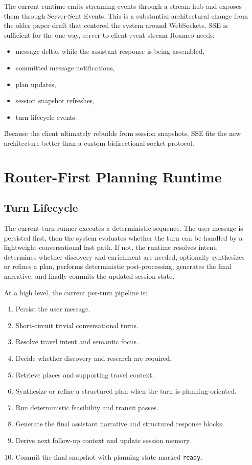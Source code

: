 \documentclass[conference]{IEEEtran}
\begin{document}
The current runtime emits streaming events through a stream hub and exposes them through Server-Sent Events. This is a substantial architectural change from the older paper draft that centered the system around WebSockets. SSE is sufficient for the one-way, server-to-client event stream Roameo needs:

\begin{itemize}
  \item message deltas while the assistant response is being assembled,
  \item committed message notifications,
  \item plan updates,
  \item session snapshot refreshes,
  \item turn lifecycle events.
\end{itemize}

Because the client ultimately rebuilds from session snapshots, SSE fits the new architecture better than a custom bidirectional socket protocol.

\section{Router-First Planning Runtime}

\subsection{Turn Lifecycle}

The current turn runner executes a deterministic sequence. The user message is persisted first, then the system evaluates whether the turn can be handled by a lightweight conversational fast path. If not, the runtime resolves intent, determines whether discovery and enrichment are needed, optionally synthesizes or refines a plan, performs deterministic post-processing, generates the final narrative, and finally commits the updated session state.

At a high level, the current per-turn pipeline is:

\begin{enumerate}
  \item Persist the user message.
  \item Short-circuit trivial conversational turns.
  \item Resolve travel intent and semantic focus.
  \item Decide whether discovery and research are required.
  \item Retrieve places and supporting travel context.
  \item Synthesize or refine a structured plan when the turn is planning-oriented.
  \item Run deterministic feasibility and transit passes.
  \item Generate the final assistant narrative and structured response blocks.
  \item Derive next follow-up context and update session memory.
  \item Commit the final snapshot with planning state marked \texttt{ready}.
\end{enumerate}
\end{document}
